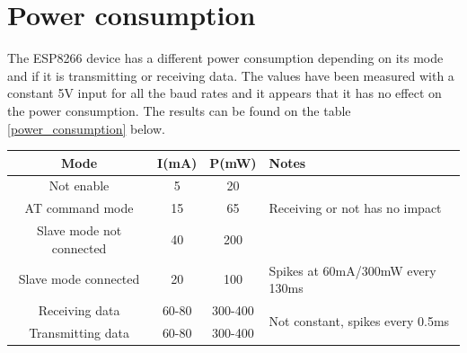 \documentclass[11pt]{article}
\begin{document}
\section{Power consumption}
The ESP8266 device has a different power consumption depending on its mode and if it is transmitting or receiving data. The values have been measured with a constant 5V input for all the baud rates and it appears that it has no effect on the power consumption. The results can be found on the table \ref{power_consumption} below.

\begin{center}
\label{power_consumption}
\begin{tabular}{|c|c|c|l|}
\hline
Mode & I(mA) & P(mW) & Notes\\
\hline
Not enable & 5 & 20 & \\
\hline
AT command mode & 15 & 65 & Receiving or not has no impact\\
\hline
Slave mode not connected & 40 & 200 & \\
\hline
Slave mode connected & 20 & 100 & Spikes at 60mA/300mW every 130ms\\
\hline
Receiving data & 60-80 & 300-400 & \multirow{2}{*}{Not constant, spikes every 0.5ms}\\
\cline{1-3}
Transmitting data & 60-80 & 300-400 & \\
\hline
\end{tabular}
\end{center}
\end{document}
